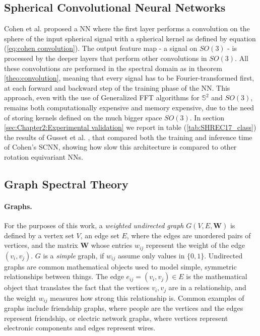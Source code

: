 \subsection{Spherical Convolutional Neural Networks}\label{sec:Chapter1:SCNN}
Cohen et al. \cite{SCNN} proposed a NN where the first layer performs a convolution on the sphere of the input spherical signal with a spherical kernel as defined by equation (\ref{eq:cohen convolution}). The output feature map - a signal on $SO(3)$ - is processed by the deeper layers that perform other convolutions in $SO(3)$. All these convolutions are performed in the spectral domain as in theorem \ref{theo:convolution}, meaning that every signal has to be Fourier-transformed first, at each forward and backward step of the training phase of the NN. This approach, even with the use of Generalized FFT algorithms for $\mathbb S^2$ and $SO(3)$, remains both computationally expensive and memory expensive, due to the need of storing kernels defined on the much bigger space $SO(3)$. In section \ref{sec:Chapter2:Experimental validation} we report in table (\ref{tab:SHREC17_class}) the results of Gusset et al. \cite{Gusset}, that compared both the training and inference time of Cohen's SCNN, showing how slow this architecture is compared to other rotation equivariant NNs.
\subsection{Graph Spectral Theory} \label{sec:Chapter1: Spectral Graph Theory}
\paragraph{Graphs.}
For the purposes of this work, a \textit{weighted undirected graph} $G(V, E, \mathbf W)$ is defined by a vertex set $V$, an edge set $E$, where the edges are unordered pairs of vertices, and the matrix $\mathbf W$ whose entries $w_{ij}$ represent the weight of the edge $(v_i, v_j)$. $G$ is a \textit{simple} graph, if $w_{ij}$ assume only values in $\{0, 1\}$. Undirected graphs are common mathematical objects used to model simple, symmetric relationships between things. The edge $e_{ij} = (v_i, v_j) \in E$ is the mathematical object that translates the fact that the vertices $v_i, v_j$ are in a relationship, and the weight $w_{ij}$ measures how strong this relationship is. Common examples of graphs include friendship graphs, where people are the vertices and the edges represent friendship, or electric network graphs, where vertices represent electronic components and edges represent wires.

